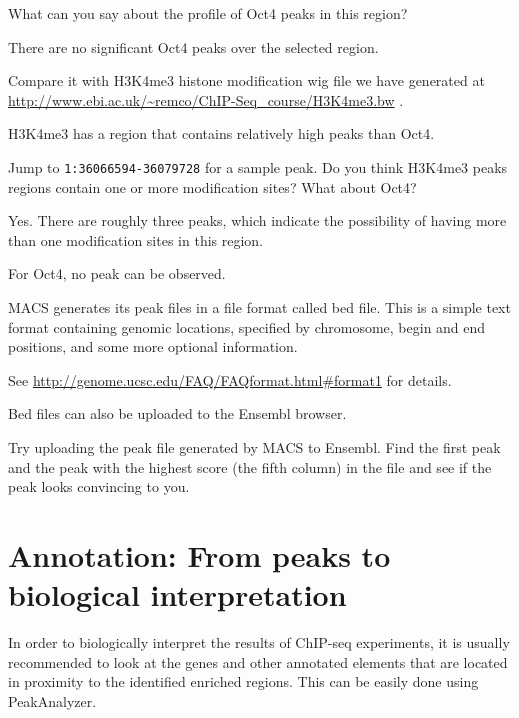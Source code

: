\begin{questions}
What can you say about the profile of Oct4 peaks in this region? 
\begin{answer}
There are no significant Oct4 peaks over the selected region.
\end{answer}

Compare it with H3K4me3 histone modification wig file we have generated at 
\url{http://www.ebi.ac.uk/~remco/ChIP-Seq_course/H3K4me3.bw} . 
\begin{answer}
H3K4me3 has a region that contains relatively high peaks than Oct4. 
\end{answer}

Jump to \texttt{1:36066594-36079728} for a sample peak. Do you think H3K4me3
peaks regions contain one or more modification sites? What about Oct4?
\begin{answer}
Yes. There are roughly three peaks, which indicate the possibility of having more than one modification sites in this region. 

For Oct4, no peak can be observed.
\end{answer}

\end{questions}

\begin{note}
MACS generates its peak files in a file format called bed file. This is a simple
text format containing genomic locations, specified by chromosome, begin and end
positions, and some more optional information.

See \url{http://genome.ucsc.edu/FAQ/FAQformat.html#format1} for details.

Bed files can also be uploaded to the Ensembl browser.
\end{note}

\begin{advanced}
Try uploading the peak file generated by MACS to Ensembl. Find the first peak and the peak with the highest score (the fifth column) in
the file and see if the peak looks convincing to you.
\end{advanced}


\section{Annotation: From peaks to biological interpretation}

\begin{information}
In order to biologically interpret the results of ChIP-seq experiments, it is
usually recommended to look at the genes and other annotated elements that are
located in proximity to the identified enriched regions. This can be easily done
using PeakAnalyzer.
\end{information}

